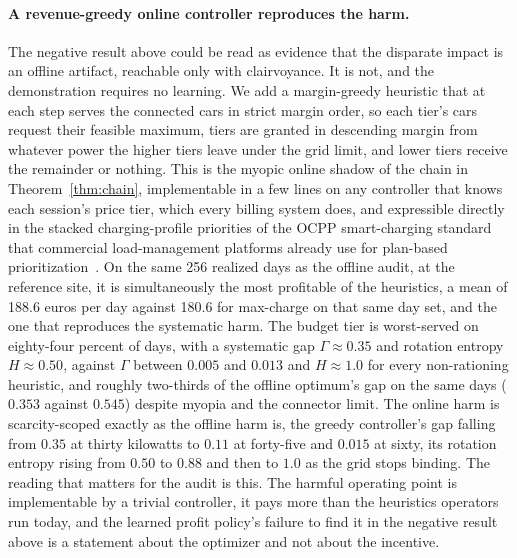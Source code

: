 \documentclass[manuscript, screen, review, anonymous]{acmart}
\begin{document}
\paragraph{A revenue-greedy online controller reproduces the harm.}
The negative result above could be read as evidence that the disparate impact is an offline artifact, reachable only with clairvoyance. It is not, and the demonstration requires no learning. We add a margin-greedy heuristic that at each step serves the connected cars in strict margin order, so each tier's cars request their feasible maximum, tiers are granted in descending margin from whatever power the higher tiers leave under the grid limit, and lower tiers receive the remainder or nothing. This is the myopic online shadow of the chain in Theorem~\ref{thm:chain}, implementable in a few lines on any controller that knows each session's price tier, which every billing system does, and expressible directly in the stacked charging-profile priorities of the OCPP smart-charging standard that commercial load-management platforms already use for plan-based prioritization~\cite{ocpp201,ampeco2026}. On the same 256 realized days as the offline audit, at the reference site, it is simultaneously the most profitable of the heuristics, a mean of 188.6 euros per day against 180.6 for max-charge on that same day set, and the one that reproduces the systematic harm. The budget tier is worst-served on eighty-four percent of days, with a systematic gap $\Gamma\approx 0.35$ and rotation entropy $H\approx 0.50$, against $\Gamma$ between $0.005$ and $0.013$ and $H\approx 1.0$ for every non-rationing heuristic, and roughly two-thirds of the offline optimum's gap on the same days ($0.353$ against $0.545$) despite myopia and the connector limit. The online harm is scarcity-scoped exactly as the offline harm is, the greedy controller's gap falling from $0.35$ at thirty kilowatts to $0.11$ at forty-five and $0.015$ at sixty, its rotation entropy rising from $0.50$ to $0.88$ and then to $1.0$ as the grid stops binding. The reading that matters for the audit is this. The harmful operating point is implementable by a trivial controller, it pays more than the heuristics operators run today, and the learned profit policy's failure to find it in the negative result above is a statement about the optimizer and not about the incentive.
\end{document}
